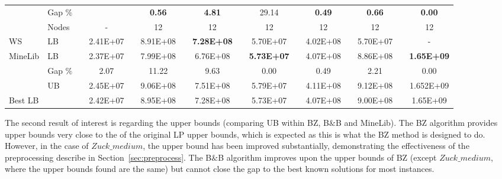 \documentclass[authoryear,11pt,square,number,times,super,comma]{elsarticle}
\begin{document}
\begin{table}[!htbp]
{\begin{tabular}{llcccccccccccccc}
&	Gap $\%$	&&		&&	{\bf 0.56}	&&	{\bf 4.81}	&&	29.14	&&	{\bf 0.49}	&&	{\bf 0.66}	&&	{\bf 0.00}	\\
	
	&	Nodes	&&	- && 12	&&	12	&&	12	&&	12	&&	12	&&	12	\\	
   \midrule
   
WS  & LB & & 2.41E+07 && 8.91E+08 && {\bf 7.28E+08} && 5.70E+07 && 4.02E+08 && 5.70E+07 && - \\
\midrule
MineLib	&	LB	&	&	2.37E+07	&	&	7.99E+08	&	&	6.76E+08	&	&	{\bf 5.73E+07}	&	&	4.07E+08	&	&	8.86E+08	&	&	{\bf 1.65E+09}	\\
&	Gap $\%$	&&	2.07	&&	11.22	&&	9.63	&&	0.00	&&	0.49	&&	2.21	&&	0.00	\\

    &	UB	&	&	2.45E+07	&	&	9.06E+08	&	&	7.51E+08	&	&	 5.79E+07	&	&	4.11E+08	&	&	9.12E+08	&	&	1.652E+09	\\
\midrule
Best LB	&		&	&	2.42E+07	&	&	8.95E+08	&	&	7.28E+08	&	&	5.73E+07	&	&	4.07E+08	&	&	9.00E+08	&	&	1.65E+09	\\
\bottomrule
\end{tabular}
}
\end{table}

The second result of interest is regarding the upper bounds (comparing UB within BZ, B$\&$B and MineLib). The BZ algorithm provides upper bounds very close to the of the original LP upper bounds, which is expected as this is what the BZ method is designed to do. However, in the case of $Zuck\_medium$, the upper bound has been improved substantially, demonstrating the effectiveness of the preprocessing describe in Section~\ref{sec:preprocess}. The B$\&$B algorithm improves upon the upper bounds of BZ (except $Zuck\_medium$, where the upper bounds found are the same) but cannot close the gap to the best known solutions for most instances.
 
\end{document}
